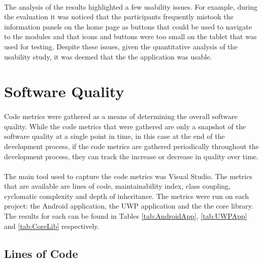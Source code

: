 {{	%
	}
	
	\paragraph{}{
	The analysis of the results highlighted a few usability issues. For example, during the evaluation it was noticed that the participants frequently mistook the information panels on the home page as buttons that could be used to navigate to the modules and that icons and buttons were too small on the tablet that was used for testing. Despite these issues, given the quantitative analysis of the usability study, it was deemed that the the application was usable.
	}		
	\label{sec:Usability}
}

\section{Software Quality}{
	\label{sec:Quality}
	\paragraph{}{
	Code metrics were gathered as a means of determining the overall software quality. While the code metrics that were gathered are only a snapshot of the software quality at a single point in time, in this case at the end of the development process, if the code metrics are gathered periodically throughout the development process, they can track the increase or decrease in quality over time.
	}
	\paragraph{}{
	The main tool used to capture the code metrics was Visual Studio. The metrics that are available are lines of code, maintainability index, class coupling, cyclomatic complexity and depth of inheritance. The metrics were run on each project: the Android application, the UWP application and the the core library. The results for each can be found in Tables \ref{tab:AndroidApp}, \ref{tab:UWPApp} and \ref{tab:CoreLib} respectively.
	}
	
	\subsection*{Lines of Code}
}
